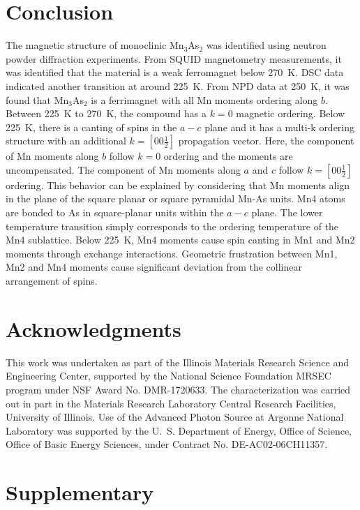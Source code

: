 \documentclass[letterpaper,10pt,doublespacing,edeposit]{uiucthesis2020}
\begin{document}
\begin{mainmatter}
\section{Conclusion}

The magnetic structure of monoclinic Mn$_3$As$_2$ was identified using neutron powder diffraction experiments. From SQUID magnetometry measurements, it was identified that the material is a weak ferromagnet below 270~K. DSC data indicated another transition at around 225~K. From NPD data at 250~K, it was found that Mn$_3$As$_2$ is a ferrimagnet with all Mn moments ordering along $b$. Between 225~K to 270~K, the compound has a $k = 0$ magnetic ordering. Below 225~K, there is a canting of spins in the $a-c$ plane and it has a multi-k ordering structure with an additional $k = [00\frac{1}{2}]$ propagation vector. Here, the component of Mn moments along $b$ follow $k = 0$ ordering and the moments are uncompensated. The component of Mn moments along $a$ and $c$ follow $k = [00\frac{1}{2}]$ ordering. This behavior can be explained by considering that Mn moments align in the plane of the square planar or square pyramidal Mn-As units. Mn4 atoms are bonded to As in square-planar units within the $a-c$ plane. The lower temperature transition simply corresponds to the ordering temperature of the Mn4 sublattice.  Below 225~K, Mn4 moments cause spin canting in Mn1 and Mn2 moments through exchange interactions. Geometric frustration between Mn1, Mn2 and Mn4 moments cause significant deviation from the collinear arrangement of spins.

\section{Acknowledgments}
This work was undertaken as part of the Illinois Materials Research Science and Engineering Center, supported by the National Science Foundation MRSEC program under NSF Award No. DMR-1720633. 
The characterization was carried out in part in the Materials Research Laboratory Central Research Facilities, University of Illinois.
Use of the Advanced Photon Source at Argonne National Laboratory was supported by the U.~S. Department of Energy, Office of Science, Office of Basic Energy Sciences, under Contract No. DE-AC02-06CH11357.

\section{Supplementary}



\end{mainmatter}
\end{document}
